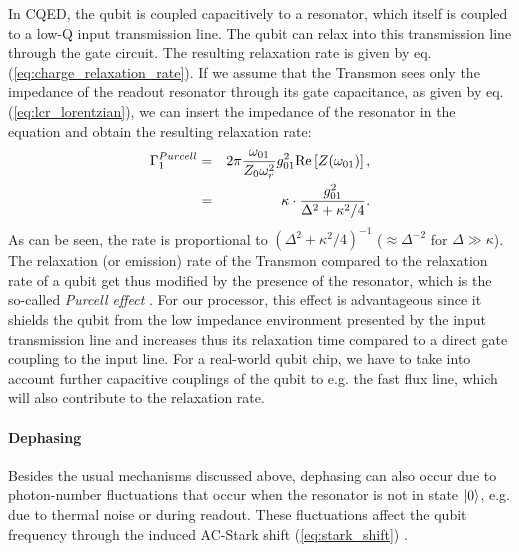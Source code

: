 In CQED, the qubit is coupled capacitively to a resonator, which itself is coupled to a low-Q input transmission line. The qubit can relax into this transmission line through the gate circuit. The resulting relaxation rate is given by eq. (\ref{eq:charge_relaxation_rate}). If we assume that the Transmon sees only the impedance of the readout resonator through its gate capacitance, as given by eq. (\ref{eq:lcr_lorentzian}), we can insert the impedance of the resonator in the equation and obtain the resulting relaxation rate:
%
\begin{eqnarray}
\Gamma_1^{Purcell} & = & 2\pi\frac{\omega_{01}}{Z_0 \omega_r^2}g_{01}^2 \mathrm{Re}\left[Z(\omega_{01})\right], \notag \\
                & = & \kappa\cdot\frac{g_{01}^2}{\Delta^2+\kappa^2/4}. \label{eq:purcell_rate}
\end{eqnarray}
%
As can be seen, the rate is proportional to $(\Delta^2+\kappa^2/4)^{-1}$ ($\approx\Delta^{-2}$ for $\Delta \gg \kappa$). The relaxation (or emission) rate of the Transmon compared to the relaxation rate of a qubit get thus modified by the presence of the resonator, which is the so-called {\it Purcell effect} \citep{purcell_spontaneous_1946}. For our processor, this effect is advantageous since it shields the qubit from the low impedance environment presented by the input transmission line and increases thus its relaxation time compared to a direct gate coupling to the input line. For a real-world qubit chip, we have to take into account further capacitive couplings of the qubit to e.g. the fast flux line, which will also contribute to the relaxation rate.

\paragraph{Dephasing} Besides the usual mechanisms discussed above, dephasing can also occur due to photon-number fluctuations that occur when the resonator is not in state $\left| 0 \right>$, e.g. due to thermal noise or during readout. These fluctuations affect the qubit frequency through the induced AC-Stark shift (\ref{eq:stark_shift}) \citep{bertet_dephasing_2005,bertet_dephasing_2005-1,rigetti_superconducting_2012}.

\smallskip

